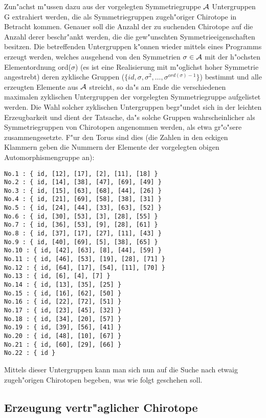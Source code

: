 Zun"achst m"ussen dazu aus der vorgelegten Symmetriegruppe $\cal A$ Untergruppen
G extrahiert werden, die als Symmetriegruppen zugeh"origer Chirotope in
Betracht kommen. Genauer soll die Anzahl der zu suchenden Chirotope auf
die Anzahl derer beschr"ankt werden, die die gew"unschten Symmetrieeigenschaften
besitzen. Die betreffenden Untergruppen k"onnen wieder mittels eines Programms
erzeugt werden, welches ausgehend von den Symmetrien $\sigma\in {\cal A}$ mit
der h"ochsten Elementordnung ord($\sigma$) (es ist eine Realisierung mit
m"oglichst hoher Symmetrie angestrebt) deren zyklische Gruppen
($\{id,\sigma,\sigma^2,\ldots,\sigma^{ord(\sigma)-1}\}$) bestimmt und alle
erzeugten Elemente aus $\cal A$ streicht, so da"s am Ende die verschiedenen
maximalen zyklischen Untergruppen der vorgelegten Symmetriegruppe aufgelistet
werden. Die Wahl solcher zyklischen Untergruppen begr"undet sich in der leichten
Erzeugbarkeit und dient der Tatsache, da"s solche Gruppen wahrscheinlicher als
Symmetriegruppen von Chirotopen angenommen werden, als etwa gr"o"sere
zusammengesetzte. F"ur den Torus sind dies (die Zahlen in den eckigen Klammern
geben die Nummern der Elemente der vorgelegten obigen Automorphismengruppe an):
\begin{verbatim}
No.1 : { id, [12], [17], [2], [11], [18] }
No.2 : { id, [14], [38], [47], [69], [49] }
No.3 : { id, [15], [63], [68], [44], [26] }
No.4 : { id, [21], [69], [58], [38], [31] }
No.5 : { id, [24], [44], [33], [63], [52] }
No.6 : { id, [30], [53], [3], [28], [55] }
No.7 : { id, [36], [53], [9], [28], [61] }
No.8 : { id, [37], [17], [27], [11], [43] }
No.9 : { id, [40], [69], [5], [38], [65] }
No.10 : { id, [42], [63], [8], [44], [59] }
No.11 : { id, [46], [53], [19], [28], [71] }
No.12 : { id, [64], [17], [54], [11], [70] }
No.13 : { id, [6], [4], [7] }
No.14 : { id, [13], [35], [25] }
No.15 : { id, [16], [62], [50] }
No.16 : { id, [22], [72], [51] }
No.17 : { id, [23], [45], [32] }
No.18 : { id, [34], [20], [57] }
No.19 : { id, [39], [56], [41] }
No.20 : { id, [48], [10], [67] }
No.21 : { id, [60], [29], [66] }
No.22 : { id }
\end{verbatim}

Mittels dieser Untergruppen kann man sich nun auf die Suche nach etwaig
zugeh"origen Chirotopen begeben, was wie folgt geschehen soll.

\subsection{Erzeugung vertr"aglicher Chirotope}

